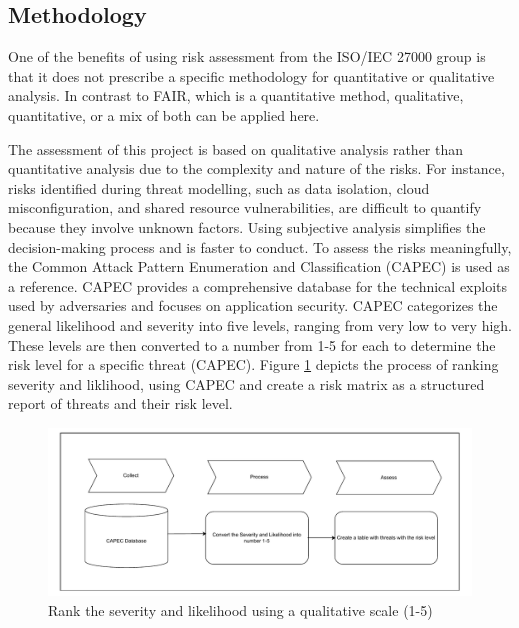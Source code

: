 \subsection{Methodology}
One of the benefits of using risk assessment from the ISO/IEC 27000 group is that it does not prescribe a specific methodology for quantitative or qualitative analysis. In contrast to FAIR, which is a quantitative method, qualitative, quantitative, or a mix of both can be applied here. 

The assessment of this project is based on qualitative analysis rather than quantitative analysis due to the complexity and nature of the risks. For instance, risks identified during threat modelling, such as data isolation, cloud misconfiguration, and shared resource vulnerabilities, are difficult to quantify because they involve unknown factors. Using subjective analysis simplifies the decision-making process and is faster to conduct. To assess the risks meaningfully, the Common Attack Pattern Enumeration and Classification (CAPEC) is used as a reference. CAPEC provides a comprehensive database for the technical exploits used by adversaries and focuses on application security. CAPEC categorizes the general likelihood and severity into five levels, ranging from very low to very high. These levels are then converted to a number from 1-5 for each to determine the risk level for a specific threat (CAPEC). Figure \ref{fig:ris_assessment_method} depicts the process of ranking severity and liklihood, using CAPEC and create a risk matrix as a structured report of threats and their risk level. 

\begin{figure}[h!]
\centering
\includegraphics[width=\textwidth]{pics/risk_assessment_method.pdf}
\caption{Rank the severity and likelihood using a qualitative scale (1-5)}\label{fig:ris_assessment_method}
\end{figure}

